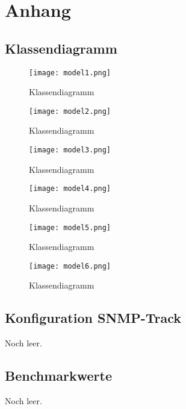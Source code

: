 \chapter{Anhang}

\captionsetup{list=false}

\section*{Klassendiagramm}
\label{cha:anh:class}

\begin{figure}[H]
\centering
\texttt{[image: model1.png]}
\caption[]{Klassendiagramm}
\label{fig:classdia1}
\end{figure}

\begin{figure}[H]
\centering
\texttt{[image: model2.png]}
\caption[]{Klassendiagramm}
\label{fig:classdia2}
\end{figure}

\begin{figure}[H]
\centering
\texttt{[image: model3.png]}
\caption[]{Klassendiagramm}
\label{fig:classdia3}
\end{figure}

\begin{figure}[H]
\centering
\texttt{[image: model4.png]}
\caption[]{Klassendiagramm}
\label{fig:classdia4}
\end{figure}

\begin{figure}[H]
\centering
\texttt{[image: model5.png]}
\caption[]{Klassendiagramm}
\label{fig:classdia5}
\end{figure}

\begin{figure}[H]
\centering
\texttt{[image: model6.png]}
\caption[]{Klassendiagramm}
\label{fig:classdia6}
\end{figure}

\section*{Konfiguration SNMP-Track}
\label{cha:Anhang1}

Noch leer.

\section*{Benchmarkwerte}
\label{cha:Anhang2}

Noch leer.